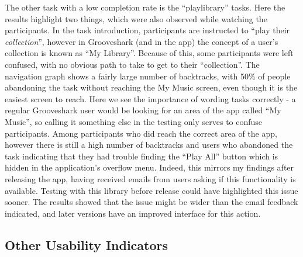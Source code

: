The other task with a low completion rate is the ``playlibrary'' tasks. Here the results
highlight two things, which were also observed while watching the participants.
In the task introduction, participants are instructed to ``play their \emph{collection}'',
however in Grooveshark (and in the app) the concept of a user's collection is known as 
``My Library''. Because of this, some participants were left confused, with no obvious path
to take to get to their ``collection''. The navigation graph shows a fairly large number of
backtracks, with 50\%
of people abandoning the task without reaching the My Music screen,
even though it is the easiest screen to reach. Here we see the importance of wording 
tasks correctly - a regular
Grooveshark user would be looking for an area of the app called ``My Music'', so
calling it something else in the testing only serves to confuse participants.
Among participants who did reach the correct area of the app, however there is still
a high number of backtracks and users who abandoned the task indicating that they had trouble
finding the ``Play All'' button which is hidden in the application's overflow menu. Indeed, this mirrors
my findings after releasing the app, having received emails from users asking if this functionality
is available. Testing with this library before release could have highlighted this issue sooner.
The results showed that the issue might be wider than the email feedback indicated, and later
versions have an improved interface for this action.

\subsection{Other Usability Indicators}

